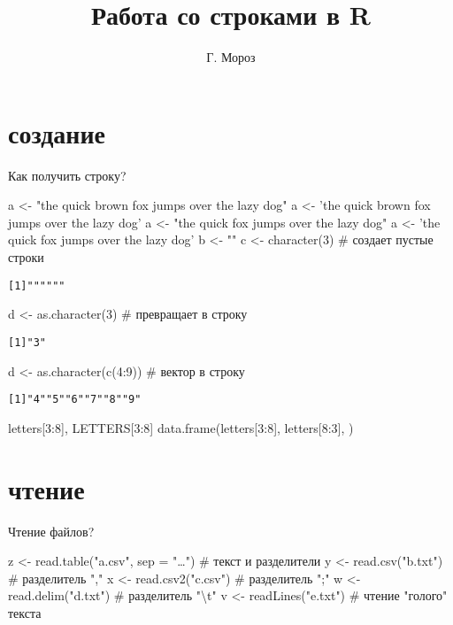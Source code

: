 
\title[]{Работа со строками в R}
\author[]{Г. Мороз}
\date{}

\frame{\titlepage}
\section{создание}
\begin{frame}[fragile]{Как получить строку?}
\begin{itemize}
\mytem a <- "the quick brown fox jumps over the lazy dog"
\mytem a <- 'the quick brown fox jumps over the lazy dog'
\mytem a <- "the quick {} fox jumps over the lazy dog"
\mytem a <- 'the quick {} fox jumps over the lazy dog'
\mytem b <- {}"{}"{}
\mytem c <- character(3) \hfill \# создает пустые строки\\
\footnotesize
\begin{alltt}
[1] "" "" ""
\end{alltt}
\normalsize
\mytem d <- as.character(3) \hfill \# превращает в строку\\
\footnotesize
\begin{alltt}
[1] "3"
\end{alltt}
\normalsize
\mytem d <- as.character(c(4:9)) \hfill \# вектор в строку\\
\footnotesize
\begin{alltt}
[1] "4" "5" "6" "7" "8" "9"
\end{alltt}
\normalsize
\mytem letters[3:8], LETTERS[3:8]
\mytem data.frame(letters[3:8], letters[8:3], {\color{red!13!blue}{stringsAsFactors = F}})
\end{itemize}
\end{frame}
\section{чтение}
\begin{frame}[fragile]{Чтение файлов?}
\begin{itemize}
\mytem z <- read.table("a.csv"{}, sep = "\dots") \hfill \# текст и разделители
\mytem y <- read.csv("b.txt") \hfill \# разделитель "{},{}"
\mytem x <- read.csv2("c.csv") \hfill \# разделитель ";"
\mytem w <- read.delim("d.txt") \hfill \# разделитель "\textbackslash t"
\mytem v <- readLines("e.txt") \hfill \# чтение "голого"{} текста
\end{itemize}
\end{frame}
